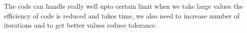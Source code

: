 \documentclass[pdflatex,sn-mathphys-num]{sn-jnl}
\begin{document}
\begin{table}[h!]
\label{tab:eigenvalues_comparison}
\end{table}

The code can handle really well upto certain limit when we take large values the efficiency of code is reduced and takes time, we also need to increase number of iterations and to get better values reduce tolerance.
\end{document}
